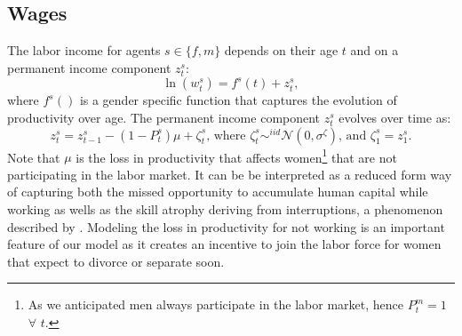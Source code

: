 \documentclass[12pt]{article}
\numberwithin{table}{section}
\begin{document}
\subsection{Wages}
The labor income for agents $s\in\{f,m\}$ depends on their age $t$ and on a permanent income component $z^s_t$:
\[\ln(w^s_t)=f^s(t)+z^s_t,\]
where $f^s()$ is a gender specific function that captures the evolution of productivity over age. The permanent income component  $z^s_t$ evolves over time as:
\begin{equation}\label{eq:pcomp}
z^s_t=z^s_{t-1}-(1-P_t^s) \mu+\zeta^s_{t}\text{, where }\zeta^s_{t}\sim^{iid}\mathcal{N}(0,\sigma^\zeta)\text{, and }\zeta^s_{1}=z^s_{1}.
\end{equation}
Note that $\mu$ is the loss in productivity that affects women\footnote{As we anticipated men always participate in the labor market, hence $P^m_t=1$ $\forall$ $t$.} that are not participating in the labor market. It can be be interpreted as a reduced form way of capturing both the missed opportunity to accumulate human capital while working as wells as the skill atrophy deriving from interruptions, a phenomenon described by \cite{adda2017}. Modeling the loss in productivity for not working is an important feature of our model as it creates an incentive to join the labor force for women that expect to divorce or separate soon. 
\end{document}
